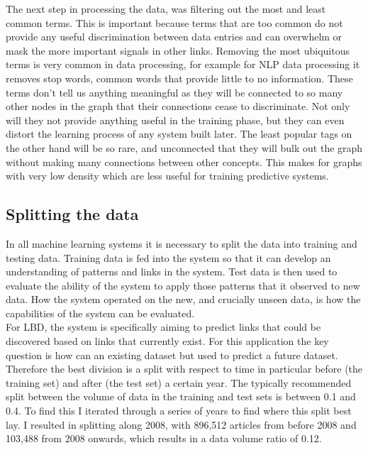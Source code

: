 \documentclass{l4proj}
\begin{document}
The next step in processing the data, was filtering out the most and least common terms. This is important because terms that are too common do not provide any useful discrimination between data entries and can overwhelm or mask the more important signals in other links. Removing the most ubiquitous terms is very common in data processing, for example for NLP data processing it removes stop words, common words that provide little to no information. These terms  don't tell us anything meaningful as they will be connected to so many other nodes in the graph that their connections cease to discriminate. Not only will they not provide anything useful in the training phase, but they can even distort the learning process of any system built later. The least popular tags on the other hand will be so rare, and unconnected that they will bulk out the graph without making many connections between other concepts. This makes for graphs with very low density which are less useful for training predictive systems.\\

\subsection{Splitting the data}

In all machine learning systems it is necessary to split the data into training and testing data. Training data is fed into the system so that it can develop an understanding of patterns and links in the system. Test data is then used to evaluate the ability of the system to apply those patterns that it observed to new data. How the system operated on the new, and crucially unseen data, is how the capabilities of the system can be evaluated. \\

For LBD, the system is specifically aiming to predict links that could be discovered based on links that currently exist. For this application the key question is how can an existing dataset but used to predict a future dataset. Therefore the best division is a split with respect to time in particular before (the training set) and after (the test set) a certain year. The typically recommended split between the volume of data in the training and test sets is between 0.1 and 0.4. To find this I iterated through a series of years to find where this split best lay. I resulted in splitting along 2008, with 896,512 articles from before 2008 and 103,488 from 2008 onwards, which results in a data volume ratio of 0.12. \\
\end{document}
